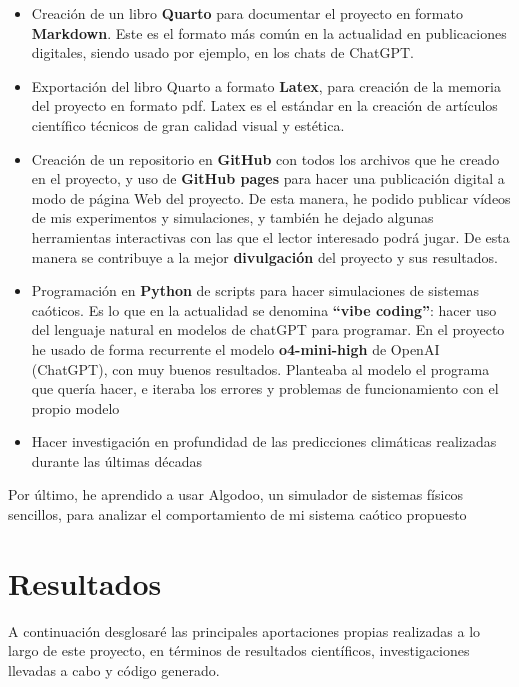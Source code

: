 \documentclass[
  10pt,
  a4paper,
  DIV=11,
  numbers=noendperiod,
  open=any]{scrreprt}
\numberwithin{equation}{chapter}
\numberwithin{equation}{chapter}
\renewcommand{\[}{\begin{equation}}
\renewcommand{\]}{\end{equation}}
\begin{document}
\begin{itemize}
\item
  Creación de un libro \textbf{Quarto} para documentar el proyecto en
  formato \textbf{Markdown}. Este es el formato más común en la
  actualidad en publicaciones digitales, siendo usado por ejemplo, en
  los chats de ChatGPT.
\item
  Exportación del libro Quarto a formato \textbf{Latex}, para creación
  de la memoria del proyecto en formato pdf. Latex es el estándar en la
  creación de artículos científico técnicos de gran calidad visual y
  estética.
\item
  Creación de un repositorio en \textbf{GitHub} con todos los archivos
  que he creado en el proyecto, y uso de \textbf{GitHub pages} para
  hacer una publicación digital a modo de página Web del proyecto. De
  esta manera, he podido publicar vídeos de mis experimentos y
  simulaciones, y también he dejado algunas herramientas interactivas
  con las que el lector interesado podrá jugar. De esta manera se
  contribuye a la mejor \textbf{divulgación} del proyecto y sus
  resultados.
\item
  Programación en \textbf{Python} de scripts para hacer simulaciones de
  sistemas caóticos. Es lo que en la actualidad se denomina
  \textbf{``vibe coding''}: hacer uso del lenguaje natural en modelos de
  chatGPT para programar. En el proyecto he usado de forma recurrente el
  modelo \textbf{o4-mini-high} de OpenAI (ChatGPT), con muy buenos
  resultados. Planteaba al modelo el programa que quería hacer, e
  iteraba los errores y problemas de funcionamiento con el propio modelo
\item
  Hacer investigación en profundidad de las predicciones climáticas
  realizadas durante las últimas décadas
\end{itemize}

Por último, he aprendido a usar Algodoo, un simulador de sistemas
físicos sencillos, para analizar el comportamiento de mi sistema caótico
propuesto


\chapter{Resultados}\label{resultados}

A continuación desglosaré las principales aportaciones propias
realizadas a lo largo de este proyecto, en términos de resultados
científicos, investigaciones llevadas a cabo y código generado.
\end{document}
